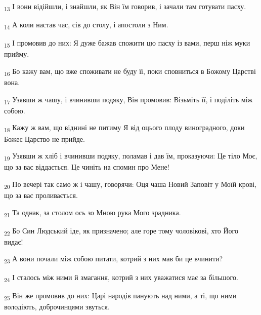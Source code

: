 \begin{tcolorbox}
\textsubscript{13} І вони відійшли, і знайшли, як Він їм говорив, і зачали там готувати пасху.
\end{tcolorbox}
\begin{tcolorbox}
\textsubscript{14} А коли настав час, сів до столу, і апостоли з Ним.
\end{tcolorbox}
\begin{tcolorbox}
\textsubscript{15} І промовив до них: Я дуже бажав спожити цю пасху із вами, перш ніж муки прийму.
\end{tcolorbox}
\begin{tcolorbox}
\textsubscript{16} Бо кажу вам, що вже споживати не буду її, поки сповниться в Божому Царстві вона.
\end{tcolorbox}
\begin{tcolorbox}
\textsubscript{17} Узявши ж чашу, і вчинивши подяку, Він промовив: Візьміть її, і поділіть між собою.
\end{tcolorbox}
\begin{tcolorbox}
\textsubscript{18} Кажу ж вам, що віднині не питиму Я від оцього плоду виноградного, доки Божеє Царство не прийде.
\end{tcolorbox}
\begin{tcolorbox}
\textsubscript{19} Узявши ж хліб і вчинивши подяку, поламав і дав їм, проказуючи: Це тіло Моє, що за вас віддається. Це чиніть на спомин про Мене!
\end{tcolorbox}
\begin{tcolorbox}
\textsubscript{20} По вечері так само ж і чашу, говорячи: Оця чаша Новий Заповіт у Моїй крові, що за вас проливається.
\end{tcolorbox}
\begin{tcolorbox}
\textsubscript{21} Та однак, за столом ось зо Мною рука Мого зрадника.
\end{tcolorbox}
\begin{tcolorbox}
\textsubscript{22} Бо Син Людський іде, як призначено; але горе тому чоловікові, хто Його видає!
\end{tcolorbox}
\begin{tcolorbox}
\textsubscript{23} А вони почали між собою питати, котрий з них мав би це вчинити?
\end{tcolorbox}
\begin{tcolorbox}
\textsubscript{24} І сталось між ними й змагання, котрий з них уважатися має за більшого.
\end{tcolorbox}
\begin{tcolorbox}
\textsubscript{25} Він же промовив до них: Царі народів панують над ними, а ті, що ними володіють, доброчинцями звуться.
\end{tcolorbox}
